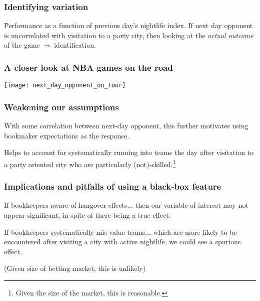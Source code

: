 \documentclass{beamer}
\begin{document}
\begin{frame}   \frametitle{Identifying variation}
  \begin{block}{Performance as a function of previous day's nightlife index.}     If next day opponent is uncorrelated with visitation to a party city,
    then looking at the \emph{actual outcome} of the game $\leadsto$ identification.
  \end{block}
\end{frame}


\begin{frame}   \frametitle{A closer look at NBA games on the road}
  \centering \texttt{[image: next\_day\_opponent\_on\_tour]} 
\end{frame}

\begin{frame}
  \frametitle{Weakening our assumptions}
  \begin{block}{With some correlation between next-day opponent, this further motivates using bookmaker expectations as the response.}
    
    Helps to account for systematically running into teams the day after visitation to 
    a party oriented city who are particularly (not)-skilled.\footnote{Given the size of the market, this is reasonable.}
  \end{block}
\end{frame}

\begin{frame}
  \frametitle{Implications and pitfalls of using a black-box feature}
  \begin{block}{If bookkeepers aware of hangover effects...}     then our variable of interest may not appear significant, in spite of there being a true effect.   \end{block}
  \vspace{12pt}
  \begin{block}{If bookkeepers systematically mis-value teams...}
     which are more likely to be encountered after visiting a city with active nightlife, we could see a spurious effect.

      (Given size of betting market, this is unlikely)
    \end{block}   
\end{frame}
\end{document}
